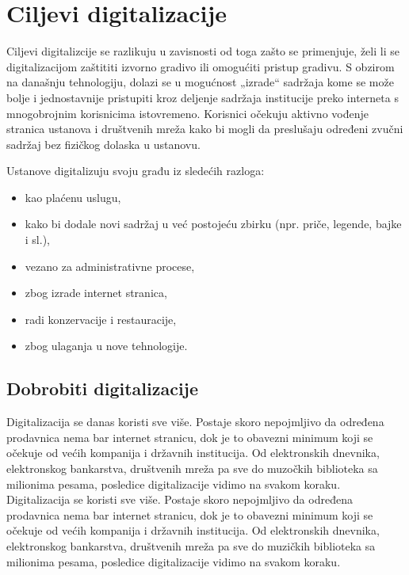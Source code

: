 \documentclass[a4paper]{article}
\begin{document}
\section{Ciljevi digitalizacije}
\label{sec:naslovN}

Ciljevi digitalizcije se razlikuju u zavisnosti od toga zašto se primenjuje, želi li se
digitalizacijom zaštititi izvorno gradivo ili omogućiti pristup gradivu. S obzirom na današnju tehnologiju, dolazi se u mogućnost „izrade“ sadržaja kome se može bolje i
jednostavnije pristupiti kroz deljenje sadržaja institucije preko interneta s mnogobrojnim korisnicima istovremeno. Korisnici očekuju aktivno vođenje stranica ustanova i društvenih
mreža kako bi mogli da preslušaju određeni zvučni sadržaj bez fizičkog dolaska u ustanovu.
 
Ustanove digitalizuju svoju građu iz sledećih razloga:

\begin{itemize}
  \item kao plaćenu uslugu,
  \item kako bi dodale novi sadržaj u već postojeću zbirku (npr. priče, legende, bajke i sl.),
  \item vezano za administrativne procese,
  \item zbog izrade internet stranica,
  \item radi konzervacije i restauracije,
  \item zbog ulaganja u nove tehnologije.
\end{itemize}

\subsection{Dobrobiti digitalizacije}
\label{sec:naslovM}

Digitalizacija se danas koristi sve više. Postaje skoro nepojmljivo da određena prodavnica nema bar internet stranicu, dok je to obavezni minimum koji se očekuje od većih kompanija i državnih institucija. Od elektronskih dnevnika, elektronskog bankarstva, društvenih mreža pa sve do muzočkih biblioteka sa milionima pesama, posledice digitalizacije vidimo na svakom koraku. 
Digitalizacija se koristi sve više. Postaje skoro nepojmljivo da određena prodavnica nema bar internet stranicu, dok je to obavezni minimum koji se očekuje od većih kompanija i državnih institucija. Od elektronskih dnevnika, elektronskog bankarstva, društvenih mreža pa sve do muzičkih biblioteka sa milionima pesama, posledice digitalizacije vidimo na svakom koraku. 
\end{document}
